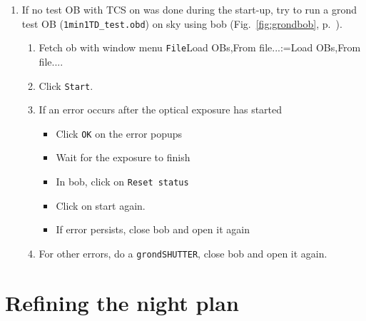 \documentclass[11pt,fleqn]{book}
\makeatletter
\def\menu#1#2{\texttt{#1}\ifx{}#2\else\@for\@x:=#2\do{$\rightarrow$\texttt{\@x}}\fi}
\def\wmenu#1#2{window menu \menu{#1}{#2}}
\def\fetchob{\wmenu{File}{Load OBs,From file...}}
\def\figref#1{Fig.~\ref{fig:#1}, p.~\pageref{fig:#1}}
\makeatother
\begin{document}
\begin{enumerate}
\begin{enumerate}
\begin{itemize}
                \item to \texttt{FEROS} for observations with \gls{feros}.
              \end{itemize}
              (Select the \texttt{mirr3} check box, select instrument, click \texttt{SETUP}, unselect checkbox.)
        \item Check \gls{grond} mirror on the \gls{grond} control (\figref{grondcon}).\\
              If necessary, type 
              \begin{itemize}
                  \item \texttt{grondM3 WFI} for \gls{feros} or \gls{wfi} observations
                  \item \texttt{grondM3 GROND} for \gls{grond} observations.
              \end{itemize}
     \end{enumerate}
  \item If no test OB with TCS on was done during the start-up, try to run a \gls{grond} test OB (\texttt{1min1TD\_test.obd}) on sky using \gls{bob} (\figref{grondbob}).
     \begin{enumerate}
       \item Fetch \gls{ob} with \fetchob.
       \item Click \texttt{Start}.      
       \item If an error occurs after the optical exposure has started
             \begin{itemize}
                \item Click \texttt{OK} on the error popups
                \item Wait for the exposure to finish
                \item In \gls{bob}, click on \texttt{Reset status}
                \item Click on start again.
                \item If error persists, close \gls{bob} and open it again
             \end{itemize} 
       \item For other errors, do a \texttt{grondSHUTTER}, close bob and open it again.
     \end{enumerate}
\end{enumerate}

\section{Refining the night plan}
\end{document}
